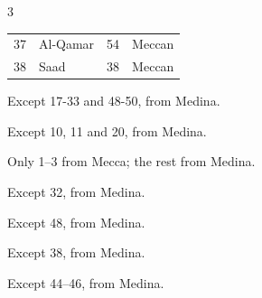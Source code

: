 \documentclass{article}
\renewcommand{\footnotesize}{\scriptsize}
\begin{document}
\begin{center}
\begin{multicols}{3}
\begin{threeparttable}
\begin{tabular}{@{}r l c l@{}}
                37            & Al-Qamar\tnote{7}     & 54           & Meccan        \\
                38            & Saad                  & 38           & Meccan        \\
            \end{tabular}
            \begin{tablenotes}
                \footnotesize
                \item[1] Except 17-33 and 48-50, from Medina.
                \item[2] Except 10, 11 and 20, from Medina.
                \item[3] Only 1--3 from Mecca; the rest from Medina.
                \item[4] Except 32, from Medina.
                \item[5] Except 48, from Medina.
                \item[6] Except 38, from Medina.
                \item[7] Except 44--46, from Medina.
            \end{tablenotes}
        \end{threeparttable}

        \columnbreak


\end{multicols}
\end{center}
\end{document}
